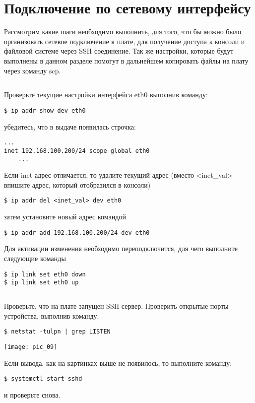 \section{Подключение по сетевому интерфейсу}

Рассмотрим какие шаги необходимо выполнить, для того, что бы можно было организовать сетевое подключение к плате, для получение доступа к консоли и файловой системе через SSH соединение. Так же настройки, которые будут выполнены в данном разделе помогут в дальнейшем копировать файлы на плату через команду scp.

\subsection{}Проверьте текущие настройки интерфейса eth0 выполнив команду: 
\begin{lstlisting}[style=bash]
$ ip addr show dev eth0 
\end{lstlisting}
убедитесь, что в выдаче появилась строчка: 
\begin{lstlisting}[style=stdout]
	...
inet 192.168.100.200/24 scope global eth0 
	...
\end{lstlisting}
Если inet адрес отличается, то удалите текущий адрес (вместо <inet\_val> впишите адрес, который отобразился в консоли)
\begin{lstlisting}[style=bash]
$ ip addr del <inet_val> dev eth0
\end{lstlisting}
затем установите новый адрес командой 
\begin{lstlisting}[style=bash]
$ ip addr add 192.168.100.200/24 dev eth0
\end{lstlisting} 
Для активации изменения необходимо переподключится, для чего выполните следующие команды
\begin{lstlisting}[style=bash]
$ ip link set eth0 down
$ ip link set eth0 up
\end{lstlisting} 

\subsection{}Проверьте, что на плате запущен SSH сервер. Проверить открытые порты устройства, выполнив команду: 

\begin{lstlisting}[style=bash]
$ netstat -tulpn | grep LISTEN
\end{lstlisting} 
\begin{center}
	\texttt{[image: pic\_09]}
\end{center}
Если вывода, как на картинках выше не появилось, то выполните команду: 
\begin{lstlisting}[style=bash]
$ systemctl start sshd 
\end{lstlisting}
и проверьте снова. 

